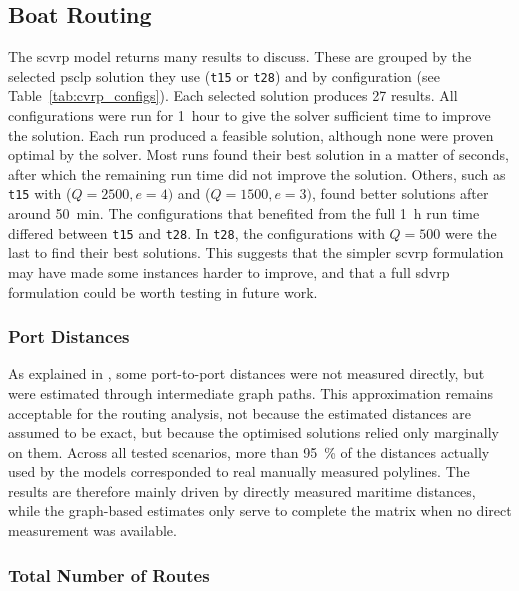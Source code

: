 \documentclass[12pt]{article}
\begin{document}
\subsection{Boat Routing}
\label{subsec:boat-routing-results}

The \ac{scvrp} model returns many results to discuss. These are grouped by the selected \ac{psclp} solution they use (\texttt{t15} or \texttt{t28}) and by configuration (see Table~\ref{tab:cvrp_configs}). Each selected solution produces \num{27} results. All configurations were run for \qty{1}{hour} to give the solver sufficient time to improve the solution. Each run produced a feasible solution, although none were proven optimal by the solver. Most runs found their best solution in a matter of seconds, after which the remaining run time did not improve the solution. Others, such as \texttt{t15} with (\(Q=2500, e=4)\) and (\(Q=1500, e=3)\), found better solutions after around \qty{50}{\minute}. The configurations that benefited from the full \qty{1}{\hour} run time differed between \texttt{t15} and \texttt{t28}. In \texttt{t28}, the configurations with \(Q=500\) were the last to find their best solutions. This suggests that the simpler \ac{scvrp} formulation may have made some instances harder to improve, and that a full \ac{sdvrp} formulation could be worth testing in future work.

\subsubsection{Port Distances}
\label{subsubsec:used-port-distances}

As explained in , some port-to-port distances were not measured directly, but were estimated through intermediate graph paths. This approximation remains acceptable for the routing analysis, not because the estimated distances are assumed to be exact, but because the optimised solutions relied only marginally on them. Across all tested scenarios, more than \qty{95}{\percent} of the distances actually used by the models corresponded to real manually measured polylines. The results are therefore mainly driven by directly measured maritime distances, while the graph-based estimates only serve to complete the matrix when no direct measurement was available.

\subsubsection{Total Number of Routes}
\label{subsubsec:total-number-routes}
\end{document}
